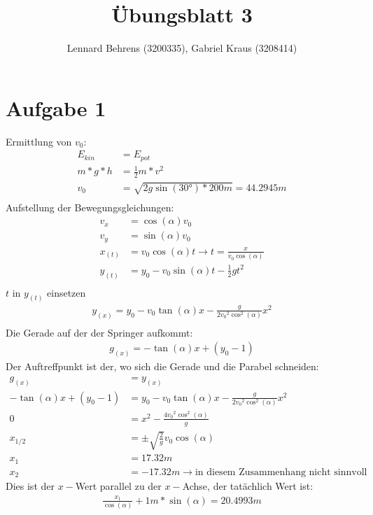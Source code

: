 \documentclass[a4paper,10pt]{extarticle}
\title{Übungsblatt 3}
\author{Lennard Behrens (3200335), Gabriel Kraus (3208414)}
\begin{document}
\maketitle

\section*{Aufgabe 1}
  Ermittlung von $v_0$: 
  \begin{align*}
  E_{kin}&=E_{pot} \\
  m*g*h &= \frac{1}{2}m*v^2 \\
  v_0&=\sqrt{2g\sin( \ang{30} )*200m} = 44.2945m \\
  \end{align*}
  Aufstellung der Bewegungsgleichungen:
  \begin{align*}
  v_x&= \cos(\alpha)v_0 \\
  v_y&= \sin(\alpha)v_0 \\
  x_{(t)}&=v_0\cos(\alpha)t \rightarrow t=\frac{x}{v_0\cos(\alpha)} \\
  y_{(t)}&=y_0-v_0\sin(\alpha)t-\frac{1}{2}gt^2 \\
  \end{align*}
  $t$ in $y_{(t)}$ einsetzen
  \begin{align*}
  y_{(x)}=y_0-v_0\tan(\alpha)x-\frac{g}{2{v_0}^2\cos^2(\alpha)}x^2 \\
  \end{align*}
  Die Gerade auf der der Springer aufkommt: 
  \begin{align*}
  g_{(x)}=-\tan(\alpha)x+(y_0-1)
  \end{align*}
  Der Auftreffpunkt ist der, wo sich die Gerade und die Parabel schneiden:
   \begin{align*}
  g_{(x)}&=y_{(x)} \\
  -\tan(\alpha)x+(y_0-1)&=y_0-v_0\tan(\alpha)x-\frac{g}{2{v_0}^2\cos^2(\alpha)}x^2 \\
  0&=x^2-\frac{4{v_0}^2\cos^2(\alpha)}{g} \\
  x_{1 \slash 2} &= \pm\sqrt{\frac{2}{g}}v_0\cos(\alpha) \\
  x_{1} &= 17.32m \\
  x_{2} &= -17.32m \rightarrow \mbox{in diesem Zusammenhang nicht sinnvoll}
  \end{align*}
  Dies ist der $x-$Wert parallel zu der $x-$Achse, der tatächlich Wert ist:
  \begin{align*}
  \frac{x_1}{\cos(\alpha)}+1m*\sin(\alpha)= 20.4993m
  \end{align*}
\end{document}
